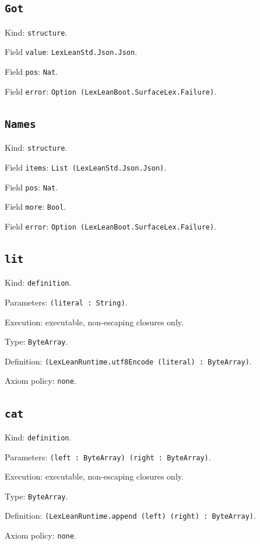 \documentclass[11pt]{article}
\begin{document}
\subsection*{\texttt{Got}}
\noindent Kind: \texttt{structure}.\par
\noindent Field \texttt{value}: \texttt{LexLeanStd.Json.Json}.\par
\noindent Field \texttt{pos}: \texttt{Nat}.\par
\noindent Field \texttt{error}: \texttt{Option (LexLeanBoot.SurfaceLex.Failure)}.\par
\subsection*{\texttt{Names}}
\noindent Kind: \texttt{structure}.\par
\noindent Field \texttt{items}: \texttt{List (LexLeanStd.Json.Json)}.\par
\noindent Field \texttt{pos}: \texttt{Nat}.\par
\noindent Field \texttt{more}: \texttt{Bool}.\par
\noindent Field \texttt{error}: \texttt{Option (LexLeanBoot.SurfaceLex.Failure)}.\par
\subsection*{\texttt{lit}}
\noindent Kind: \texttt{definition}.\par
\noindent Parameters: \texttt{(literal : String)}.\par
\noindent Execution: executable, non-escaping closures only.\par
\noindent Type: \texttt{ByteArray}.\par
\noindent Definition: \texttt{(LexLeanRuntime.utf8Encode (literal) : ByteArray)}.\par
\noindent Axiom policy: \texttt{none}.\par
\subsection*{\texttt{cat}}
\noindent Kind: \texttt{definition}.\par
\noindent Parameters: \texttt{(left : ByteArray) (right : ByteArray)}.\par
\noindent Execution: executable, non-escaping closures only.\par
\noindent Type: \texttt{ByteArray}.\par
\noindent Definition: \texttt{(LexLeanRuntime.append (left) (right) : ByteArray)}.\par
\noindent Axiom policy: \texttt{none}.\par
\end{document}
